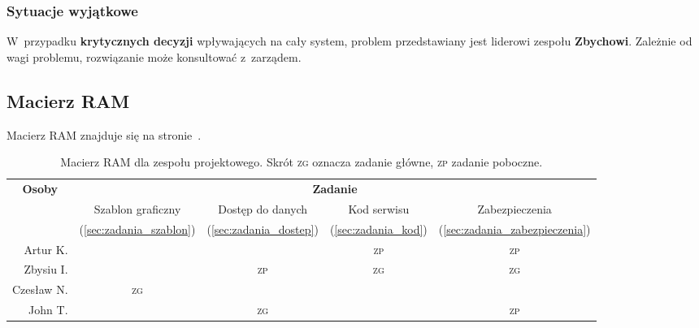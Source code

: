 \documentclass[10pt,a4paper]{article}
\begin{document}
\subsubsection{Sytuacje wyjątkowe}
W~przypadku {\bf krytycznych decyzji} wpływających na cały system, problem
przedstawiany jest liderowi zespołu {\bf Zbychowi}. Zależnie od wagi problemu,
rozwiązanie może konsultować z~zarządem.

\subsection{Macierz RAM}
Macierz RAM znajduje się na stronie~\pageref{tab:macierz_ram}.
\begin{table}[p]
  \centering
  \begin{tabular}{r|*{4}{c}}
    \toprule
    \multicolumn{1}{c|}{\multirow{3}{*}{\bf Osoby}} & \multicolumn{4}{c}{\bf Zadanie} \\
    \cmidrule{2-5}
    &
    Szablon graficzny &
    Dostęp do danych &
    Kod serwisu &
    Zabezpieczenia \\
    &
    (\ref{sec:zadania_szablon}) &
    (\ref{sec:zadania_dostep}) &
    (\ref{sec:zadania_kod}) &
    (\ref{sec:zadania_zabezpieczenia}) \\
    \midrule
    Artur K. & & & \textsc{zp} & \textsc{zp} \\
    Zbysiu I. & & \textsc{zp} & \textsc{zg} & \textsc{zg} \\
    Czesław N. & \textsc{zg} & & & \\
    John T. & & \textsc{zg} & & \textsc{zp} \\
    \bottomrule
  \end{tabular}
  \label{tab:macierz_ram}
  \caption{Macierz RAM dla zespołu projektowego. Skrót \textsc{zg} oznacza zadanie główne, \textsc{zp} zadanie poboczne.}
\end{table}
\end{document}
